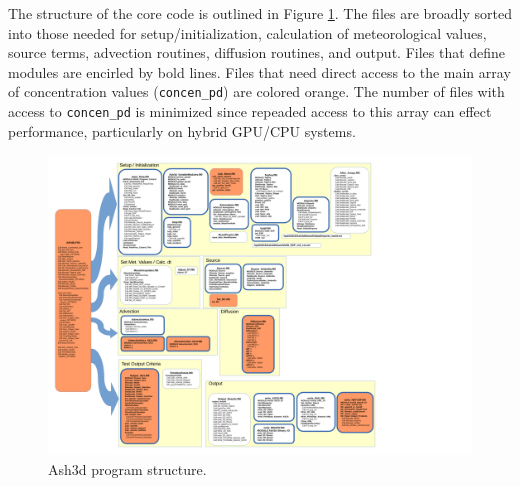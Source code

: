 The structure of the core code is outlined in Figure \ref{FigSoftwareDesign}.
The files are broadly sorted into those needed for setup/initialization,
calculation of meteorological values, source terms, advection routines, 
diffusion routines, and output.  Files that define modules are encirled
by bold lines.  Files that need direct access to the main array of concentration
values (\texttt{concen\_pd}) are colored orange.  The number of files with
access to \texttt{concen\_pd} is minimized since repeaded access to this
array can effect performance, particularly on hybrid GPU/CPU systems.
\begin{figure}[htbp]\begin{center}
 \includegraphics[angle=90,scale=0.35]{Figures/Chap_SoftStruct_FlowChartFiles.pdf}
\parbox{15cm}{\caption{\label{FigSoftwareDesign}
Ash3d program structure.
}}
\end{center}\end{figure}


